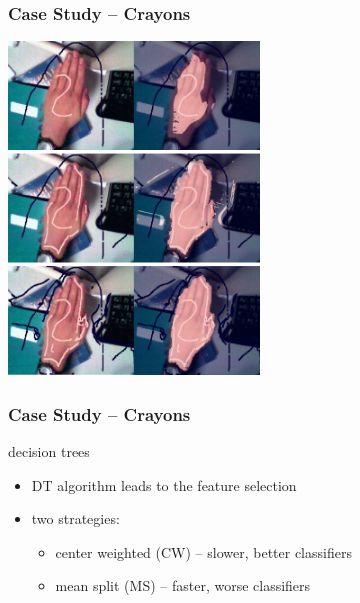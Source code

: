 \documentclass[xcolor=svgnames]{beamer}
\begin{document}
\begin{frame}
	\frametitle{Case Study -- Crayons}
	\begin{center}
		\includegraphics[width=0.5\textwidth]{img/crayons-example.png}
	\end{center}
\end{frame}
\begin{frame}
	\frametitle{Case Study -- Crayons}
	\begin{center}
		{\Large decision trees}
	\end{center}

	\begin{itemize}
		\item DT algorithm leads to the feature selection
		\item two strategies:
			\begin{itemize}
				\item center weighted (CW) -- slower, better classifiers
				\item mean split (MS) -- faster, worse classifiers
			\end{itemize}
	\end{itemize}
\end{frame}
\end{document}
